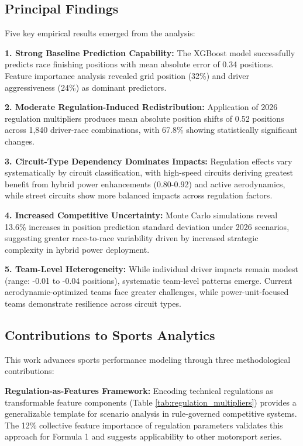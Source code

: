 \documentclass[conference]{IEEEtran}
\begin{document}
\subsection{Principal Findings}

Five key empirical results emerged from the analysis:

\textbf{1. Strong Baseline Prediction Capability:} The XGBoost model successfully predicts race finishing positions with mean absolute error of 0.34 positions. Feature importance analysis revealed grid position (32\%) and driver aggressiveness (24\%) as dominant predictors.

\textbf{2. Moderate Regulation-Induced Redistribution:} Application of 2026 regulation multipliers produces mean absolute position shifts of 0.52 positions across 1,840 driver-race combinations, with 67.8\% showing statistically significant changes.

\textbf{3. Circuit-Type Dependency Dominates Impacts:} Regulation effects vary systematically by circuit classification, with high-speed circuits deriving greatest benefit from hybrid power enhancements (0.80-0.92) and active aerodynamics, while street circuits show more balanced impacts across regulation factors.

\textbf{4. Increased Competitive Uncertainty:} Monte Carlo simulations reveal 13.6\% increases in position prediction standard deviation under 2026 scenarios, suggesting greater race-to-race variability driven by increased strategic complexity in hybrid power deployment.

\textbf{5. Team-Level Heterogeneity:} While individual driver impacts remain modest (range: -0.01 to -0.04 positions), systematic team-level patterns emerge. Current aerodynamic-optimized teams face greater challenges, while power-unit-focused teams demonstrate resilience across circuit types.

\subsection{Contributions to Sports Analytics}

This work advances sports performance modeling through three methodological contributions:

\textbf{Regulation-as-Features Framework:} Encoding technical regulations as transformable feature components (Table \ref{tab:regulation_multipliers}) provides a generalizable template for scenario analysis in rule-governed competitive systems. The 12\% collective feature importance of regulation parameters validates this approach for Formula 1 and suggests applicability to other motorsport series.
\end{document}
